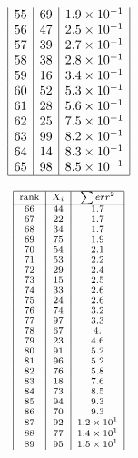 {\begin{table}[!hb]
\begin{minipage}[t]{.3\linewidth}
\[\begin{array}{|c|c|c|}
 55 & 69 & 1.9\times 10^{-1} \\
 56 & 47 & 2.5\times 10^{-1} \\
 57 & 39 & 2.7\times 10^{-1} \\
 58 & 38 & 2.8\times 10^{-1} \\
 59 & 16 & 3.4\times 10^{-1} \\
 60 & 52 & 5.3\times 10^{-1} \\
 61 & 28 & 5.6\times 10^{-1} \\
 62 & 25 & 7.5\times 10^{-1} \\
 63 & 99 & 8.2\times 10^{-1} \\
 64 & 14 & 8.3\times 10^{-1} \\
 65 & 98 & 8.5\times 10^{-1} \\
 \hline
\end{array} \]
\end{minipage}%
\begin{minipage}[t]{.3\linewidth}
\centering
\[ \scriptsize
\begin{array}{|c|c|c|}
\hline
 \text{rank} & X_i %
 & \sum{err^2} \\
 \hline
 66 & 44 & 1.7 \\
 67 & 22 & 1.7 \\
 68 & 34 & 1.7 \\
 69 & 75 & 1.9 \\
 70 & 54 & 2.1 \\
 71 & 53 & 2.2 \\
 72 & 29 & 2.4 \\
 73 & 15 & 2.5 \\
 74 & 33 & 2.6 \\
 75 & 24 & 2.6 \\
 76 & 74 & 3.2 \\
 77 & 97 & 3.3 \\
 78 & 67 & 4. \\
 79 & 23 & 4.6 \\
 80 & 91 & 5.2 \\
 81 & 96 & 5.2 \\
 82 & 76 & 5.8 \\
 83 & 18 & 7.6 \\
 84 & 73 & 8.5 \\
 85 & 94 & 9.3 \\
 86 & 70 & 9.3 \\
 87 & 92 & 1.2\times 10^1 \\
 88 & 77 & 1.4\times 10^1 \\
 89 & 95 & 1.5\times 10^1 \\

\end{array}\]
\end{minipage}
\end{table}}
